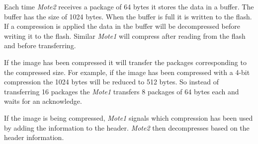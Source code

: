 
Each time \emph{Mote2} receives a package of 64 bytes it stores the data in a buffer. The buffer has the size of 1024 bytes. When the buffer is full it is written to the flash. If a compression is applied the data in the buffer will be decompressed before writing it to the flash. Similar \emph{Mote1} will compress after reading from the flash and before transferring.

If the image has been compressed it will transfer the packages corresponding to the compressed size. For example, if the image has been compressed with a 4-bit compression the 1024 bytes will be reduced to 512 bytes. So instead of transferring 16 packages the \emph{Mote1} transfers 8 packages of 64 bytes each and waits for an acknowledge.

If the image is being compressed, \emph{Mote1} signals which compression has been used by adding the information to the header. \emph{Mote2} then  decompresses based on the header information.